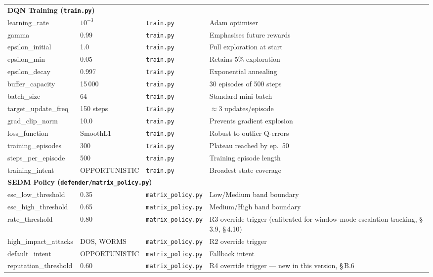 \begin{longtable}{p{3.8cm}p{2.6cm}p{3.5cm}p{3.2cm}}
  \multicolumn{4}{l}{\textbf{DQN Training (\texttt{train.py})}} \\[3pt]
  learning\_rate     & $10^{-3}$   & \texttt{train.py}    & Adam optimiser \\
  gamma              & 0.99        & \texttt{train.py}    & Emphasises future rewards \\
  epsilon\_initial   & 1.0         & \texttt{train.py}    & Full exploration at start \\
  epsilon\_min       & 0.05        & \texttt{train.py}    & Retains 5\% exploration \\
  epsilon\_decay     & 0.997       & \texttt{train.py}    & Exponential annealing \\
  buffer\_capacity   & 15\,000     & \texttt{train.py}    & 30 episodes of 500 steps \\
  batch\_size        & 64          & \texttt{train.py}    & Standard mini-batch \\
  target\_update\_freq & 150 steps & \texttt{train.py}    & $\approx$3 updates/episode \\
  grad\_clip\_norm   & 10.0        & \texttt{train.py}    & Prevents gradient explosion \\
  loss\_function     & SmoothL1    & \texttt{train.py}    & Robust to outlier Q-errors \\
  training\_episodes & 300         & \texttt{train.py}    & Plateau reached by ep.\ 50 \\
  steps\_per\_episode & 500        & \texttt{train.py}    & Training episode length \\
  training\_intent   & OPPORTUNISTIC & \texttt{train.py}  & Broadest state coverage \\[6pt]

  \multicolumn{4}{l}{\textbf{SEDM Policy (\texttt{defender/matrix\_policy.py})}} \\[3pt]
  esc\_low\_threshold  & 0.35      & \texttt{matrix\_policy.py} & Low/Medium band boundary \\
  esc\_high\_threshold & 0.65      & \texttt{matrix\_policy.py} & Medium/High band boundary \\
  rate\_threshold      & 0.80      & \texttt{matrix\_policy.py} & R3 override trigger (calibrated for window-mode escalation tracking, \S\,3.9, \S\,4.10) \\
  high\_impact\_attacks & DOS, WORMS & \texttt{matrix\_policy.py} & R2 override trigger \\
  default\_intent    & OPPORTUNISTIC & \texttt{matrix\_policy.py} & Fallback intent \\
  reputation\_threshold & 0.60     & \texttt{matrix\_policy.py} & R4 override trigger --- new in this version, \S\,B.6 \\[6pt]


\end{longtable}
